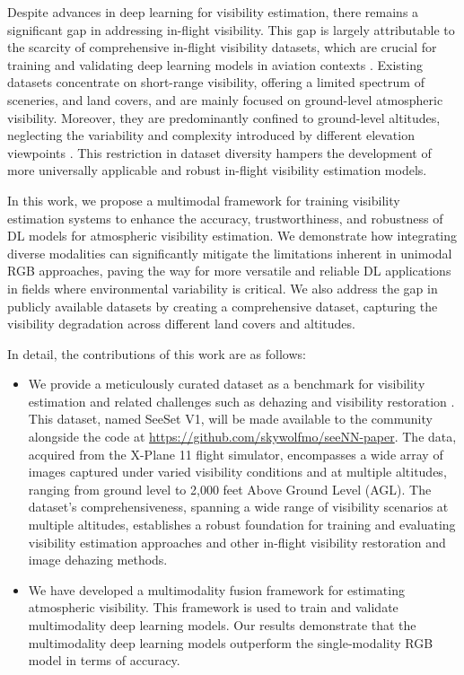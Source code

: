 \documentclass{article}
\begin{document}
Despite advances in deep learning for visibility estimation, there remains a significant gap in addressing in-flight visibility. This gap is largely attributable to the scarcity of comprehensive in-flight visibility datasets, which are crucial for training and validating deep learning models in aviation contexts \cite{AitOuadil2023}. Existing datasets concentrate on short-range visibility, offering a limited spectrum of sceneries, and land covers, and are mainly focused on ground-level atmospheric visibility. Moreover, they are predominantly confined to ground-level altitudes, neglecting the variability and complexity introduced by different elevation viewpoints \cite{AitOuadil2023}. This restriction in dataset diversity hampers the development of more universally applicable and robust in-flight visibility estimation models.

In this work, we propose a multimodal framework for training visibility estimation systems to enhance the accuracy, trustworthiness, and robustness of DL models for atmospheric visibility estimation. We demonstrate how integrating diverse modalities can significantly mitigate the limitations inherent in unimodal RGB approaches, paving the way for more versatile and reliable DL applications in fields where environmental variability is critical. We also address the gap in publicly available datasets by creating a comprehensive dataset, capturing the visibility degradation across different land covers and altitudes.



In detail, the contributions of this work are as follows:
\begin{itemize}
    \item We provide a meticulously curated dataset as a benchmark for visibility estimation and related challenges such as dehazing and visibility restoration \cite{gui2023comprehensive}. This dataset, named SeeSet V1, will be made available to the community alongside the code at \url{https://github.com/skywolfmo/seeNN-paper}. The data, acquired from the X-Plane 11 flight simulator, encompasses a wide array of images captured under varied visibility conditions and at multiple altitudes, ranging from ground level to 2,000 feet Above Ground Level (AGL).  
    The dataset's comprehensiveness, spanning a wide range of visibility scenarios at multiple altitudes, establishes a robust foundation for training and evaluating visibility estimation approaches and other in-flight visibility restoration and image dehazing methods.
    
    \item  We have developed a multimodality fusion framework for estimating atmospheric visibility. This framework is used to train and validate multimodality deep learning models. Our results demonstrate that the multimodality deep learning models outperform the single-modality RGB model in terms of accuracy.


\end{itemize}



\end{document}
